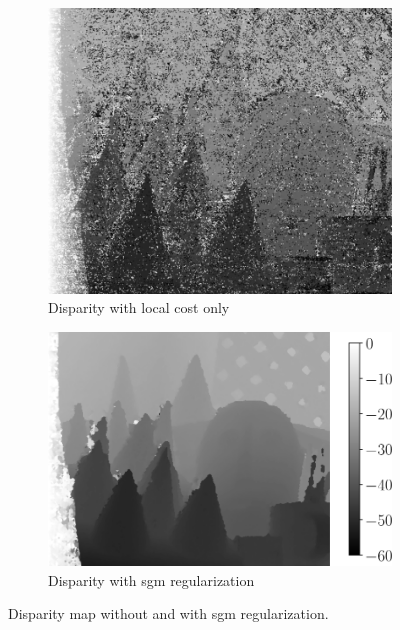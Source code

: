\begin{figure}
    \begin{subfigure}[t]{0.42\linewidth}
        \flushleft
        \includegraphics[width=\linewidth]{Images/Chap_1/disparity_map_no_sgm.png}
        \caption{Disparity with local cost only}
        \label{fig:disparity_map_no_sgm}
    \end{subfigure}\hfill
    \begin{subfigure}[t]{0.514\linewidth}
        \flushright
        \includegraphics[width=\linewidth]{Images/Chap_1/disparity_with_sgm.png}
        \caption{Disparity with \acrshort{sgm} regularization}
        \label{fig:disparity_map_with_sgm}
    \end{subfigure}
    \caption{Disparity map without and with \acrshort{sgm} regularization.}
    \label{fig:disparity_map_with_and_without_sgm}
\end{figure}

